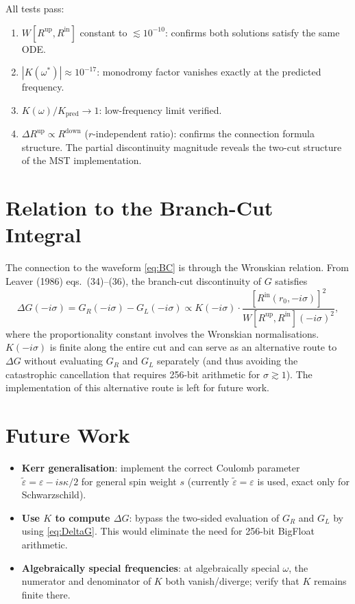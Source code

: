 \documentclass[12pt,a4paper]{article}
\newcommand{\Rup}{R^{\mathrm{up}}}
\newcommand{\Rdown}{R^{\mathrm{down}}}
\newcommand{\Rin}{R^{\mathrm{in}}}
\newcommand{\epst}{\tilde{\varepsilon}}
\begin{document}
All tests pass:
\begin{enumerate}
  \item[A.] $W[\Rup,\Rin]$ constant to $\lesssim 10^{-10}$: confirms both solutions
            satisfy the same ODE.
  \item[B.] $|K(\omega^*)| \approx 10^{-17}$: monodromy factor vanishes exactly
            at the predicted frequency.
  \item[C.] $K(\omega)/K_{\mathrm{pred}} \to 1$: low-frequency limit verified.
  \item[D.] $\Delta \Rup \propto \Rdown$ ($r$-independent ratio):
            confirms the connection formula structure.
            The partial discontinuity magnitude reveals the two-cut
            structure of the MST implementation.
\end{enumerate}

\section{Relation to the Branch-Cut Integral}

The connection to the waveform \eqref{eq:BC} is through the Wronskian relation.
From Leaver (1986) eqs.~(34)--(36), the branch-cut discontinuity of $G$ satisfies
\begin{equation}
  \Delta G(-i\sigma) = G_R(-i\sigma) - G_L(-i\sigma)
  \propto K(-i\sigma) \cdot \frac{[\Rin(r_0, -i\sigma)]^2}
  {W[\Rup,\Rin](-i\sigma)^2},
  \label{eq:DeltaG}
\end{equation}
where the proportionality constant involves the Wronskian normalisations.
$K(-i\sigma)$ is finite along the entire cut and can serve as an alternative route to
$\Delta G$ without evaluating $G_R$ and $G_L$ separately (and thus avoiding the
catastrophic cancellation that requires 256-bit arithmetic for $\sigma \gtrsim 1$).
The implementation of this alternative route is left for future work.

\section{Future Work}

\begin{itemize}
  \item \textbf{Kerr generalisation}: implement the correct Coulomb parameter
    $\epst = \varepsilon - is\kappa/2$ for general spin weight $s$ (currently
    $\epst = \varepsilon$ is used, exact only for Schwarzschild).
  \item \textbf{Use $K$ to compute $\Delta G$}: bypass the two-sided evaluation
    of $G_R$ and $G_L$ by using \eqref{eq:DeltaG}.  This would eliminate the
    need for 256-bit BigFloat arithmetic.
  \item \textbf{Algebraically special frequencies}: at algebraically special $\omega$,
    the numerator and denominator of $K$ both vanish/diverge; verify that $K$ remains
    finite there.
\end{itemize}
\end{document}
